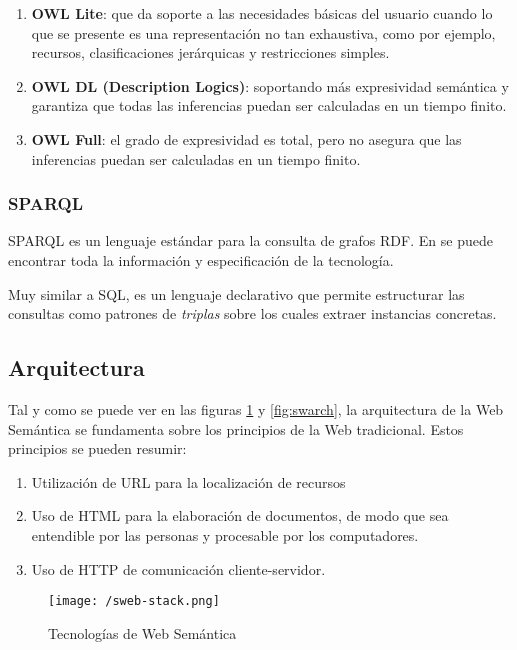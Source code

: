 \begin{enumerate}
\item \textbf{\acs{OWL} Lite}: que da soporte a las necesidades básicas del
  usuario cuando lo que se presente es una representación no tan exhaustiva,
  como por ejemplo, recursos, clasificaciones jerárquicas y restricciones
  simples. 
\item \textbf{\acs{OWL} DL (Description Logics)}: soportando más expresividad
  semántica y garantiza que todas las inferencias puedan ser calculadas en un
  tiempo finito.  
\item \textbf{\acs{OWL} Full}: el grado de expresividad es total, pero no
  asegura que las inferencias puedan ser calculadas en un tiempo finito. 
\end{enumerate}


\subsubsection{\acf{SPARQL}}

\acs{SPARQL} es un lenguaje estándar para la consulta de grafos \acs{RDF}. En
\cite{SPARQL} se puede encontrar toda la información y especificación de la
tecnología. 

Muy similar a \acf{SQL}, es un lenguaje declarativo que permite estructurar las
consultas como patrones de \textit{triplas} sobre los cuales extraer instancias
concretas. 

\subsection{Arquitectura}

Tal y como se puede ver en las figuras \ref{fig:swstack} y \ref{fig:swarch}, la arquitectura de la Web Semántica
se fundamenta sobre los principios de la Web tradicional. Estos principios se
pueden resumir: 

\begin{enumerate}
\item Utilización de \acf{URL} para la localización de recursos
\item Uso de \acf{HTML} para la elaboración de documentos, de modo que sea
  entendible por las personas y procesable por los computadores. 
\item Uso de \acf{HTTP} de comunicación cliente-servidor.
\end{enumerate}

\begin{figure}[!h]
  \begin{center}
    \texttt{[image: /sweb-stack.png]} 
    \caption{Tecnologías de Web Semántica}
    \label{fig:swstack}
  \end{center}
\end{figure}


